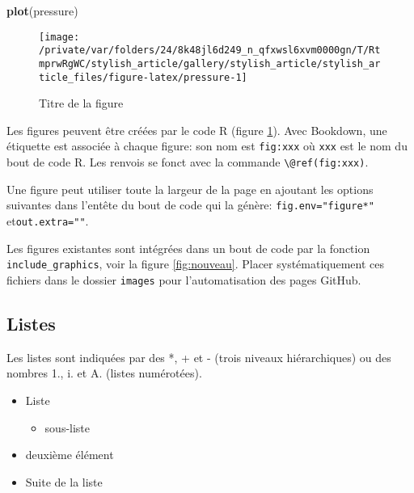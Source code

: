 \documentclass[fleqn,10pt]{latex/stylish_article} %
\providecommand{\tightlist}{%
  \setlength{\itemsep}{0pt}\setlength{\parskip}{0pt}}
\newenvironment{Shaded}{\begin{snugshade}}{\end{snugshade}}
\newcommand{\KeywordTok}[1]{\textcolor[rgb]{0.13,0.29,0.53}{\textbf{{#1}}}}
\newcommand{\NormalTok}[1]{{#1}}
\begin{document}
\scriptsize

\begin{Shaded}
\begin{Highlighting}[]
\KeywordTok{plot}\NormalTok{(pressure)}
\end{Highlighting}
\end{Shaded}

\begin{figure}

{\centering \texttt{[image: /private/var/folders/24/8k48jl6d249\_n\_qfxwsl6xvm0000gn/T/RtmprwRgWC/stylish\_article/gallery/stylish\_article/stylish\_article\_files/figure-latex/pressure-1]} 

}

\caption{Titre de la figure}\label{fig:pressure}
\end{figure}

\normalsize

Les figures peuvent être créées par le code R (figure \ref{fig:pressure}).
Avec Bookdown, une étiquette est associée à chaque figure: son nom est \texttt{fig:xxx} où \texttt{xxx} est le nom du bout de code R.
Les renvois se fonct avec la commande \texttt{\textbackslash{}@ref(fig:xxx)}.

Une figure peut utiliser toute la largeur de la page en ajoutant les options suivantes dans l'entête du bout de code qui la génère: \texttt{fig.env="figure*"} et\break \texttt{out.extra=""}.

Les figures existantes sont intégrées dans un bout de code par la fonction \texttt{include\_graphics}, voir la figure \ref{fig:nouveau}.
Placer systématiquement ces fichiers dans le dossier \texttt{images} pour l'automatisation des pages GitHub.

\hypertarget{listes}{%
\subsection{Listes}\label{listes}}

Les listes sont indiquées par des *, + et - (trois niveaux hiérarchiques) ou des nombres 1., i. et A. (listes numérotées).

\begin{itemize}
\tightlist
\item
  Liste

  \begin{itemize}
  \tightlist
  \item
    sous-liste
  \end{itemize}
\item
  deuxième élément
\item
  Suite de la liste
\end{itemize}
\end{document}
